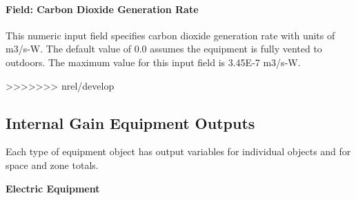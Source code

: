 \paragraph{Field: Carbon Dioxide Generation Rate}\label{field-carbon-dioxide-generation-rate-otherequip-other-definition}

This numeric input field specifies carbon dioxide generation rate with units of m3/s-W. The default value of 0.0 assumes the equipment is fully vented to outdoors. The maximum value for this input field is 3.45E-7 m3/s-W.

>>>>>>> nrel/develop
\subsection{Internal Gain Equipment Outputs}\label{outputs-5-004}

Each type of equipment object has output variables for individual objects and for space and zone totals.

\textbf{Electric Equipment}

